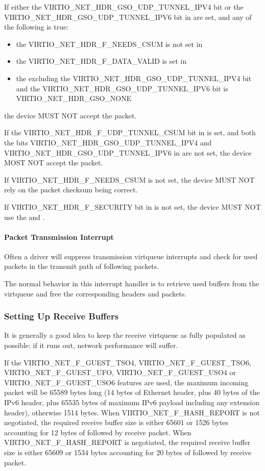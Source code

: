 If either the VIRTIO_NET_HDR_GSO_UDP_TUNNEL_IPV4 bit or
the VIRTIO_NET_HDR_GSO_UDP_TUNNEL_IPV6 bit in  are set, and any of
the following is true:
\begin{itemize}
\item the VIRTIO_NET_HDR_F_NEEDS_CSUM is not set in 
\item the VIRTIO_NET_HDR_F_DATA_VALID is set in 
\item the  excluding the VIRTIO_NET_HDR_GSO_UDP_TUNNEL_IPV4
bit and the VIRTIO_NET_HDR_GSO_UDP_TUNNEL_IPV6 bit is VIRTIO_NET_HDR_GSO_NONE
\end{itemize}
the device MUST NOT accept the packet.

If the VIRTIO_NET_HDR_F_UDP_TUNNEL_CSUM bit in  is set,
and both the bits VIRTIO_NET_HDR_GSO_UDP_TUNNEL_IPV4 and
VIRTIO_NET_HDR_GSO_UDP_TUNNEL_IPV6 in  are not set,
the device MOST NOT accept the packet.

If VIRTIO_NET_HDR_F_NEEDS_CSUM is not set, the device MUST NOT
rely on the packet checksum being correct.

If VIRTIO_NET_HDR_F_SECURITY bit in  is not set, the
device MUST NOT use the  and .

\paragraph{Packet Transmission Interrupt}\label{sec:Device Types / Network Device / Device Operation / Packet Transmission / Packet Transmission Interrupt}

Often a driver will suppress transmission virtqueue interrupts
and check for used packets in the transmit path of following
packets.

The normal behavior in this interrupt handler is to retrieve
used buffers from the virtqueue and free the corresponding
headers and packets.

\subsubsection{Setting Up Receive Buffers}\label{sec:Device Types / Network Device / Device Operation / Setting Up Receive Buffers}

It is generally a good idea to keep the receive virtqueue as
fully populated as possible: if it runs out, network performance
will suffer.

If the VIRTIO_NET_F_GUEST_TSO4, VIRTIO_NET_F_GUEST_TSO6,
VIRTIO_NET_F_GUEST_UFO, VIRTIO_NET_F_GUEST_USO4 or VIRTIO_NET_F_GUEST_USO6
features are used, the maximum incoming packet
will be 65589 bytes long (14 bytes of Ethernet header, plus 40 bytes of
the IPv6 header, plus 65535 bytes of maximum IPv6 payload including any
extension header), otherwise 1514 bytes.
When VIRTIO_NET_F_HASH_REPORT is not negotiated, the required receive buffer
size is either 65601 or 1526 bytes accounting for 12 bytes of
 followed by receive packet.
When VIRTIO_NET_F_HASH_REPORT is negotiated, the required receive buffer
size is either 65609 or 1534 bytes accounting for 20 bytes of
 followed by receive packet.

